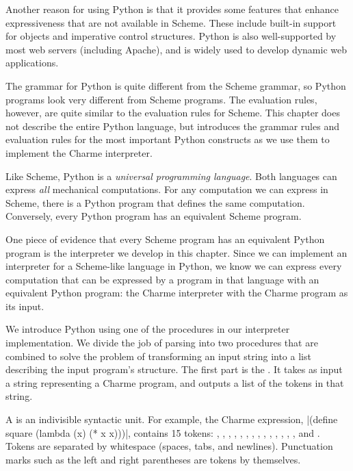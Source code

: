 Another reason for using Python is that it provides some features that enhance expressiveness that are not available in Scheme.  These include built-in support for objects  and imperative control structures.  Python is also well-supported by most web servers (including Apache), and is widely used to develop dynamic web applications.

The grammar for Python is quite different from the Scheme grammar, so Python programs look very different from Scheme programs.  The evaluation rules, however, are quite similar to the evaluation rules for Scheme.  This chapter does not describe the entire Python language, but introduces the grammar rules and evaluation rules for the most important Python constructs as we use them to implement the Charme interpreter.  


Like Scheme, Python is a \emph{universal programming language}.  Both languages can express \emph{all} mechanical computations.  For any computation we can express in Scheme, there is a Python program that defines the same computation.  Conversely, every Python program has an equivalent Scheme program.  

One piece of evidence that every Scheme program has an equivalent Py\-thon program is the interpreter we develop in this chapter.  Since we can implement an interpreter for a Scheme-like language in Python, we know we can express every computation that can be expressed by a program in that language with an equivalent Python program: the Charme interpreter with the Charme program as its input.    

 We introduce Python using one of the procedures in our interpreter implementation.   We divide the job of parsing into two procedures that are combined to solve the problem of transforming an input string into a list describing the input program's structure.  The first part is the .  It takes as input a string representing a Charme program, and outputs a list of the tokens in that string.  

A  is an indivisible syntactic unit.  For example, the Charme expression, 
\scheme|(define square (lambda (x) (* x x)))|, contains 15 tokens: \keyword{(}, , , \keyword{(}, , \keyword{(}, , \keyword{)}, \keyword{(}, \keyword{*}, , , \keyword{)}, \keyword{)}, and \keyword{)}.  Tokens are separated by whitespace (spaces, tabs, and newlines).  Punctuation marks such as the left and right parentheses are tokens by themselves.


